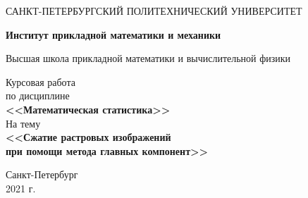 \begin{titlepage}
   \begin{center}
       \vspace*{3cm}
       \large{САНКТ-ПЕТЕРБУРГСКИЙ ПОЛИТЕХНИЧЕСКИЙ УНИВЕРСИТЕТ}
       \vspace{0.4 cm}
       
       \large\textbf{Институт прикладной математики и механики}
       \vspace{0.4 cm}
       
       \large{Высшая школа прикладной математики и вычислительной физики}
       
       \vspace{3 cm}
       \Large{Курсовая работа\\ по дисциплине \\\textbf{ <<Математическая статистика>>}\\}
       \vspace{1 cm}
       \large{На тему\\\textbf{<<Сжатие растровых изображений\\при помощи метода главных компонент>>}}
       \vfill
            
       \vspace{0.8cm}
     
            
       \normalsize{Санкт-Петербург\\2021 г.}
            
   \end{center}
\end{titlepage}